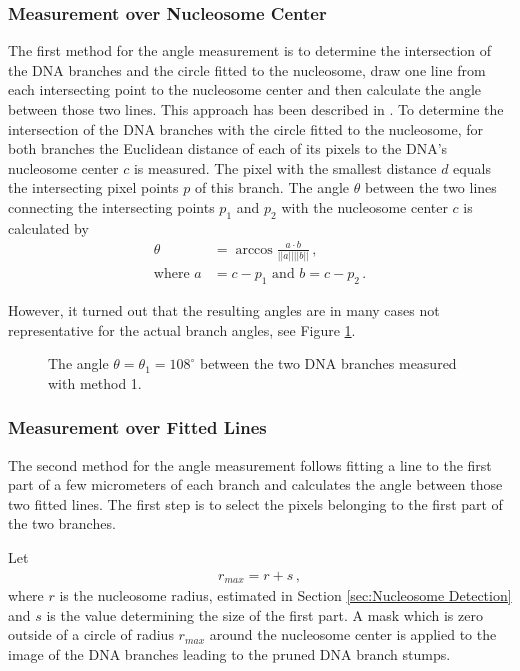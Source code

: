 \documentclass{article}
\begin{document}
\subsubsection{Measurement over Nucleosome Center}\label{sec:Measurement over Nucleosome Center}
The first method for the angle measurement is to determine the intersection of the DNA branches and the circle fitted to the nucleosome, draw one line from each intersecting point to the nucleosome center and then calculate the angle between those two lines. This approach has been described in \cite{bussiek2005dna}.
To determine the intersection of the DNA branches with the circle fitted to the nucleosome, for both branches the Euclidean distance of each of its pixels to the DNA's nucleosome center $c$ is measured. The pixel with the smallest distance $d$ equals the intersecting pixel points $p$ of this branch.
The angle $\theta$ between the two lines connecting the intersecting points $p_1$ and $p_2$ with the nucleosome center $c$ is calculated by
\begin{align}
\theta &= \arccos{\frac{a\cdot b}{||a||||b||}}\, ,\label{eq: angle}\\
\text{where } a &= c-p_1 \text{ and } b = c-p_2 \, .\nonumber
\end{align}

However, it turned out that the resulting angles are in many cases not representative for the actual branch angles, see Figure \ref{fig: angle1}. 
\begin{figure}[htb!]
\centering
\def\svgwidth{0.5\textwidth}

\caption{The angle $\theta=\theta_1 = 108^{\circ}$ between the two DNA branches measured with method 1.}\label{fig: angle1}
\end{figure}
\subsubsection{Measurement over Fitted Lines}\label{sec:Measurement over Fitted Lines}
The second method for the angle measurement follows \cite{kepert2003conformation} fitting a line to the first part of a few micrometers of each branch and calculates the angle between those two fitted lines.
The first step is to select the pixels belonging to the first part of the two branches. 

Let \begin{align*}
r_{max} = r+s\, ,
\end{align*}
where $r$ is the nucleosome radius, estimated in Section \ref{sec:Nucleosome Detection} and $s$ is the value determining the size of the first part. A mask which is zero outside of a circle of radius $r_{max}$ around the nucleosome center is applied to the image of the DNA branches leading to the pruned DNA branch stumps.
\end{document}
